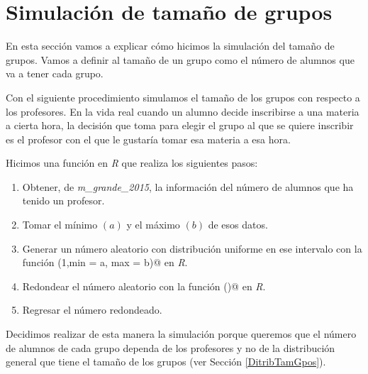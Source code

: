 


\section{Simulación de tamaño de grupos} \label{SimTamGpos}

En esta sección vamos a explicar cómo hicimos la simulación del tamaño de grupos. Vamos a definir al tamaño de un grupo como el número de alumnos que va a tener cada grupo.

Con el siguiente procedimiento simulamos el tamaño de los grupos con respecto a los profesores. En la vida real cuando un alumno decide inscribirse a una materia a cierta hora, la decisión que toma para elegir el grupo al que se quiere inscribir es el profesor con el que le gustaría tomar esa materia a esa hora.

Hicimos una función en \textit{R} que realiza los siguientes pasos:
  
  \begin{enumerate}

\item Obtener, de \textit{m\_grande\_2015}, la información del número de alumnos que ha tenido un profesor.

\item Tomar el mínimo $(a)$ y el máximo $(b)$ de esos datos.

\item Generar un número aleatorio con distribución uniforme en ese intervalo con la función \verb@runif(1,min = a, max = b)@ en \textit{R}.

\item Redondear el número aleatorio con la función \verb@ceiling()@ en \textit{R}.

\item Regresar el número redondeado.
\end{enumerate}

Decidimos realizar de esta manera la simulación porque queremos que el número de alumnos de cada grupo dependa de los profesores y no de la distribución general que tiene el tamaño de los grupos (ver Sección \ref{DitribTamGpos}).



